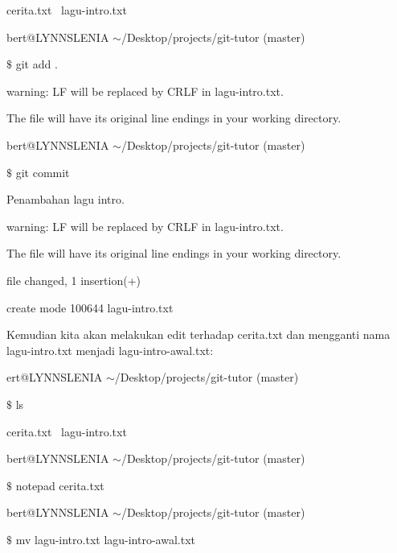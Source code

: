 \noindent 
{\fontsize{10pt}{10pt}\selectfont cerita.txt~ lagu-intro.txt} \par
\noindent 
\vspace{10pt}
\noindent 
{\fontsize{10pt}{10pt}\selectfont bert@LYNNSLENIA  $  \sim  $/Desktop/projects/git-tutor (master)} \par
\noindent 
{\fontsize{10pt}{10pt}\selectfont  $  \$  $ git add .} \par
\noindent 
{\fontsize{10pt}{10pt}\selectfont warning: LF will be replaced by CRLF in lagu-intro.txt.} \par
\noindent 
{\fontsize{10pt}{10pt}\selectfont The file will have its original line endings in your working directory.} \par
\noindent 
\vspace{10pt}
\noindent 
{\fontsize{10pt}{10pt}\selectfont bert@LYNNSLENIA  $  \sim  $/Desktop/projects/git-tutor (master)} \par
\noindent 
{\fontsize{10pt}{10pt}\selectfont  $  \$  $ git commit} \par
\noindent 
{\fontsize{10pt}{10pt}\selectfont [master 03d0628] Penambahan lagu intro.} \par
\noindent 
{\fontsize{10pt}{10pt}\selectfont warning: LF will be replaced by CRLF in lagu-intro.txt.} \par
\noindent 
{\fontsize{10pt}{10pt}\selectfont The file will have its original line endings in your working directory.} \par
\noindent 
{\fontsize{10pt}{10pt} file changed, 1 insertion(+)} \par
\noindent 
{\fontsize{10pt}{10pt}\selectfont  create mode 100644 lagu-intro.txt} \par
\vspace{12pt}
Kemudian kita akan melakukan edit terhadap cerita.txt dan mengganti nama lagu-intro.txt menjadi lagu-intro-awal.txt: \par
ert@LYNNSLENIA  $  \sim  $/Desktop/projects/git-tutor (master) \par
 $  \$  $ ls \par
cerita.txt~ lagu-intro.txt \par
bert@LYNNSLENIA  $  \sim  $/Desktop/projects/git-tutor (master) \par
 $  \$  $ notepad cerita.txt \par
bert@LYNNSLENIA  $  \sim  $/Desktop/projects/git-tutor (master) \par
 $  \$  $ mv lagu-intro.txt lagu-intro-awal.txt \par
